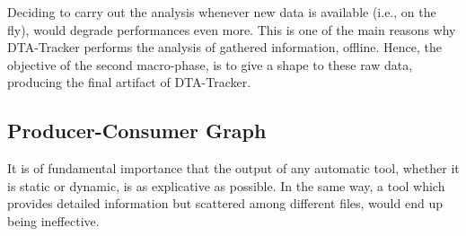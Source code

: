 \documentclass[LaM,binding=0.6cm]{sapthesis}
\begin{document}
Deciding to carry out the analysis whenever new data is available (i.e., on the fly), would degrade performances even more. This is one of the main reasons why DTA-Tracker performs the analysis of gathered information, offline. Hence, the objective of the second macro-phase, is to give a shape to these raw data, producing the final artifact of DTA-Tracker.

\subsection{Producer-Consumer Graph}
It is of fundamental importance that the output of any automatic tool, whether it is static or dynamic, is as explicative as possible. In the same way, a tool which provides detailed information but scattered among different files, would end up being ineffective.\\
\end{document}
